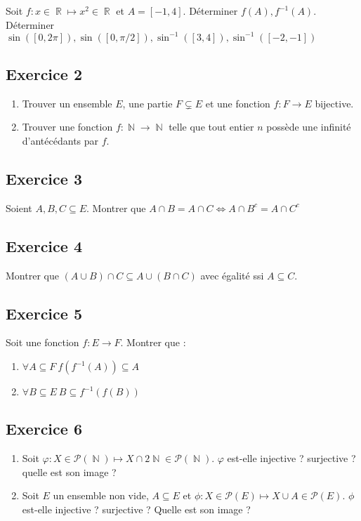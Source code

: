 \documentclass{article}
\DeclareMathOperator{\R}{\mathbb{R}}
\DeclareMathOperator{\N}{\mathbb{N}}
\begin{document}
Soit $f: x\in \R \mapsto x^2 \in \R$ et $A = [-1, 4]$. Déterminer $f(A), f^{-1}(A)$. Déterminer $\sin([0, 2\pi]), \sin([0, \pi/2]), \sin^{-1}([3, 4]), \sin^{-1}([-2, -1])$ 

\subsection*{Exercice 2} 

\begin{enumerate}
    \item Trouver un ensemble $E$, une partie $F \subsetneq E$ et une fonction $f : F \to E$ bijective. 
    \item Trouver une fonction $f:\N \to \N$ telle que tout entier $n$ possède une infinité d'antécédants par $f$. 
\end{enumerate}

\subsection*{Exercice 3} 

Soient $A, B, C \subseteq E$. Montrer que $A\cap B = A\cap C \Leftrightarrow A\cap B^c = A\cap C^c$ 

\subsection*{Exercice 4} 

Montrer que $(A\cup B) \cap C \subseteq A \cup (B\cap C)$ avec égalité ssi $A \subseteq C$. 

\subsection*{Exercice 5} 

Soit une fonction $f:E\to F$. Montrer que :
\begin{enumerate}
    \item $\forall A\subseteq F \ f(f^{-1}(A)) \subseteq A $ 
    \item $\forall B\subseteq E \ B \subseteq f^{-1}(f(B))$ 
\end{enumerate}

\subsection*{Exercice 6} 

\begin{enumerate}
    \item Soit $\varphi : X \in \mathcal{P}(\N) \mapsto X\cap 2\N \in \mathcal{P}(\N)$. $\varphi$ est-elle injective ? surjective ? quelle est son image ?
    \item Soit $E$ un ensemble non vide, $A\subseteq E$ et $\phi : X \in \mathcal{P}(E) \mapsto X\cup A \in \mathcal{P}(E)$. $\phi$ est-elle injective ? surjective ? Quelle est son image ?
\end{enumerate}
\end{document}
